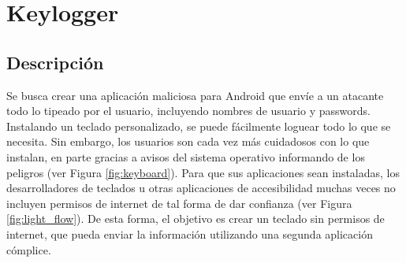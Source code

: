 \section{Keylogger}

	\subsection{Descripción}

	Se busca crear una aplicación maliciosa para Android que envíe a un atacante todo lo tipeado por el usuario, incluyendo nombres de usuario y passwords. Instalando un teclado personalizado, se puede fácilmente loguear todo lo que se necesita. Sin embargo, los usuarios son cada vez más cuidadosos con lo que instalan, en parte gracias a avisos del sistema operativo informando de los peligros (ver Figura \ref{fig:keyboard}). Para que sus aplicaciones sean instaladas, los desarrolladores de teclados u otras aplicaciones de accesibilidad muchas veces no incluyen permisos de internet de tal forma de dar confianza (ver Figura \ref{fig:light_flow}).
	De esta forma, el objetivo es crear un teclado sin permisos de internet, que pueda enviar la información utilizando una segunda aplicación cómplice.
	
